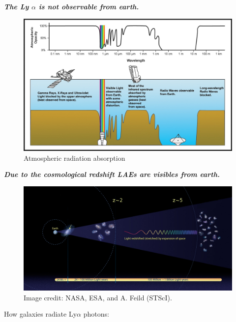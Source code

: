 \documentclass{beamer}
\begin{document}
\begin{frame}{\textit{\textbf{The Ly $\alpha$ is not observable from earth.}}}
\begin{figure}
\includegraphics[scale=0.8]{Figures/AtmosphericEM.jpg}
\caption*{Atmospheric radiation absorption}
\end{figure}
\end{frame}



\begin{frame}{\textit{\textbf{Due to the cosmological redshift LAEs are visibles from earth.}}}
\begin{figure}
\includegraphics[scale=0.3]{Figures/expansion.jpg}
\caption*{Image credit: NASA, ESA, and A. Feild (STScI).}
\end{figure}
\end{frame}

\begin{frame}
\begin{center}
\LARGE{ How galaxies radiate Ly$\alpha$ photons:}
\end{center}
\end{frame}
\end{document}

